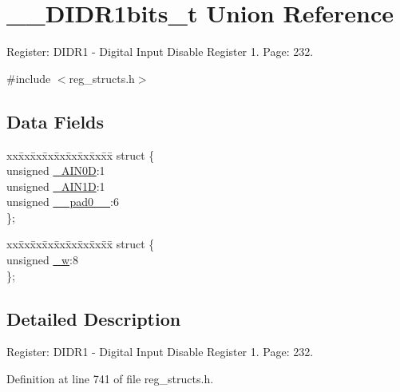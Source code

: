 \hypertarget{union_____d_i_d_r1bits__t}{\section{\+\_\+\+\_\+\+D\+I\+D\+R1bits\+\_\+t Union Reference}
\label{union_____d_i_d_r1bits__t}
}


Register\+: D\+I\+D\+R1 -\/ Digital Input Disable Register 1. Page\+: 232.  




{\ttfamily \#include $<$reg\+\_\+structs.\+h$>$}

\subsection*{Data Fields}
\begin{DoxyCompactItemize}
\item 
\begin{tabbing}
xx\=xx\=xx\=xx\=xx\=xx\=xx\=xx\=xx\=\kill
struct \{\\
\>unsigned \hyperlink{union_____d_i_d_r1bits__t_a3f4c3ce247e4f061fc8a77555d28323b}{\_AIN0D}:1\\
\>unsigned \hyperlink{union_____d_i_d_r1bits__t_a8c694a878fbec691810ff0f3081cfbd0}{\_AIN1D}:1\\
\>unsigned \hyperlink{union_____d_i_d_r1bits__t_a41f120ade4bbbf891be7c1254ff24ef0}{\_\_pad0\_\_}:6\\
\}; \\

\end{tabbing}\item 
\begin{tabbing}
xx\=xx\=xx\=xx\=xx\=xx\=xx\=xx\=xx\=\kill
struct \{\\
\>unsigned \hyperlink{union_____d_i_d_r1bits__t_a4e7a332f9a400cffe49f593c4029b800}{\_w}:8\\
\}; \\

\end{tabbing}\end{DoxyCompactItemize}


\subsection{Detailed Description}
Register\+: D\+I\+D\+R1 -\/ Digital Input Disable Register 1. Page\+: 232. 

Definition at line 741 of file reg\+\_\+structs.\+h.



